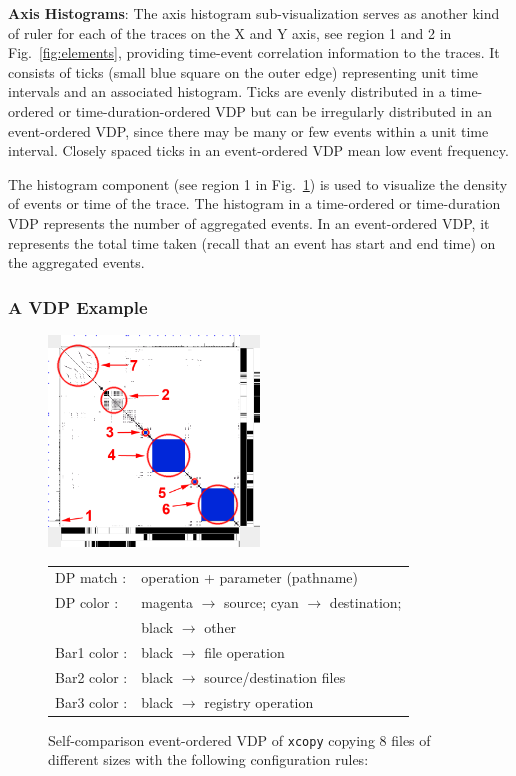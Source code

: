 {\bf Axis Histograms}:
The axis histogram sub-visualization
serves as another kind of ruler for each of the traces on the X and Y axis,
see region 1 and 2 in Fig.~\ref{fig:elements}, providing
time-event correlation information to the traces.
It consists of
ticks (small blue square on the outer edge) representing unit time intervals
and an associated histogram.
Ticks are evenly distributed in a time-ordered or time-duration-ordered VDP
but can be irregularly distributed in an event-ordered VDP,
since there may be many or few events within a unit time interval.
Closely spaced ticks in an event-ordered VDP mean low event frequency.

The histogram component (see region 1 in Fig.~\ref{fig:cp-xcopy})
is used to visualize the density of events or time
of the trace.
The histogram in a time-ordered or time-duration VDP
represents the number of aggregated events.
In an event-ordered VDP,
it represents the total time taken (recall that an event has start and end
time) on the aggregated events.

\subsubsection{A VDP Example}

\begin{figure}[htb]
\begin{center}
\includegraphics[width=0.5\textwidth]{lviz/cp-xcopy.png}
\caption{Self-comparison event-ordered VDP of {\tt xcopy}
copying 8 files of different sizes with the following configuration rules:
}
\begin{tabular}{ll}
DP match : & operation + parameter (pathname)\\
DP color : & magenta $\rightarrow$ source; cyan $\rightarrow$ destination;\\
 & black $\rightarrow$ other\\
Bar1 color : & black $\rightarrow$ file operation\\
Bar2 color : & black $\rightarrow$ source/destination files\\
Bar3 color : & black $\rightarrow$ registry operation
\end{tabular}
\label{fig:cp-xcopy}
\end{center}
\end{figure}


